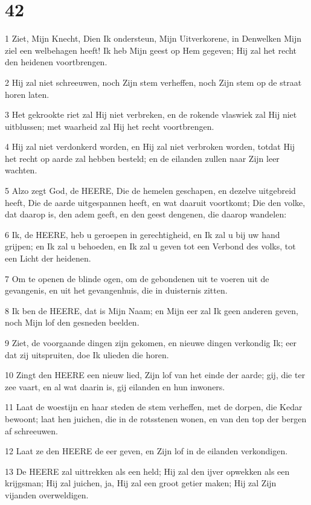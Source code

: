 \chapter{42}

\par 1 Ziet, Mijn Knecht, Dien Ik ondersteun, Mijn Uitverkorene, in Denwelken Mijn ziel een welbehagen heeft! Ik heb Mijn geest op Hem gegeven; Hij zal het recht den heidenen voortbrengen.
\par 2 Hij zal niet schreeuwen, noch Zijn stem verheffen, noch Zijn stem op de straat horen laten.
\par 3 Het gekrookte riet zal Hij niet verbreken, en de rokende vlaswiek zal Hij niet uitblussen; met waarheid zal Hij het recht voortbrengen.
\par 4 Hij zal niet verdonkerd worden, en Hij zal niet verbroken worden, totdat Hij het recht op aarde zal hebben besteld; en de eilanden zullen naar Zijn leer wachten.
\par 5 Alzo zegt God, de HEERE, Die de hemelen geschapen, en dezelve uitgebreid heeft, Die de aarde uitgespannen heeft, en wat daaruit voortkomt; Die den volke, dat daarop is, den adem geeft, en den geest dengenen, die daarop wandelen:
\par 6 Ik, de HEERE, heb u geroepen in gerechtigheid, en Ik zal u bij uw hand grijpen; en Ik zal u behoeden, en Ik zal u geven tot een Verbond des volks, tot een Licht der heidenen.
\par 7 Om te openen de blinde ogen, om de gebondenen uit te voeren uit de gevangenis, en uit het gevangenhuis, die in duisternis zitten.
\par 8 Ik ben de HEERE, dat is Mijn Naam; en Mijn eer zal Ik geen anderen geven, noch Mijn lof den gesneden beelden.
\par 9 Ziet, de voorgaande dingen zijn gekomen, en nieuwe dingen verkondig Ik; eer dat zij uitspruiten, doe Ik ulieden die horen.
\par 10 Zingt den HEERE een nieuw lied, Zijn lof van het einde der aarde; gij, die ter zee vaart, en al wat daarin is, gij eilanden en hun inwoners.
\par 11 Laat de woestijn en haar steden de stem verheffen, met de dorpen, die Kedar bewoont; laat hen juichen, die in de rotsstenen wonen, en van den top der bergen af schreeuwen.
\par 12 Laat ze den HEERE de eer geven, en Zijn lof in de eilanden verkondigen.
\par 13 De HEERE zal uittrekken als een held; Hij zal den ijver opwekken als een krijgsman; Hij zal juichen, ja, Hij zal een groot getier maken; Hij zal Zijn vijanden overweldigen.
